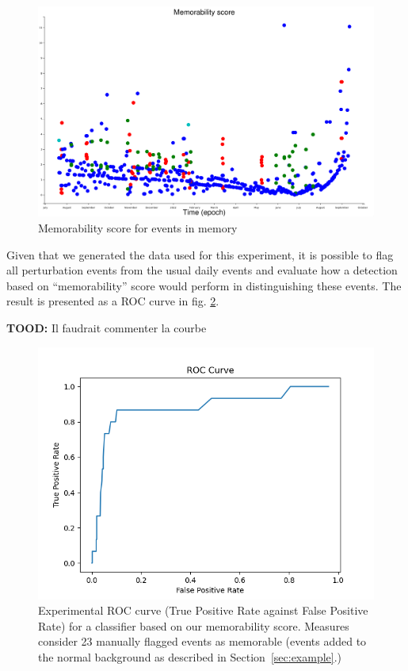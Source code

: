 \documentclass[conference]{IEEEtran}
\begin{document}
\begin{figure}[ht]
  \centering
  \includegraphics[width=\linewidth]{figures/complexities_surprises}
\caption{Memorability score for events in memory}
  \label{fig:result1}
\end{figure}

Given that we generated the data used for this experiment, it is possible to
flag all perturbation events from the usual daily events and evaluate how a
detection based on ``memorability'' score would perform in distinguishing these
events. The result is presented as a ROC curve in fig. \ref{fig:roc}.

\textbf{TOOD:} Il faudrait commenter la courbe
\begin{figure}[ht]
  \centering
  \includegraphics[width=\linewidth]{./figures/roc}
  \caption{Experimental ROC curve (True Positive Rate against False Positive
Rate) for a classifier based on our memorability score. Measures consider 23
manually flagged events as memorable (events added to the normal background
as described in Section~\ref{sec:example}.)}
  \label{fig:roc}
\end{figure}
\end{document}
